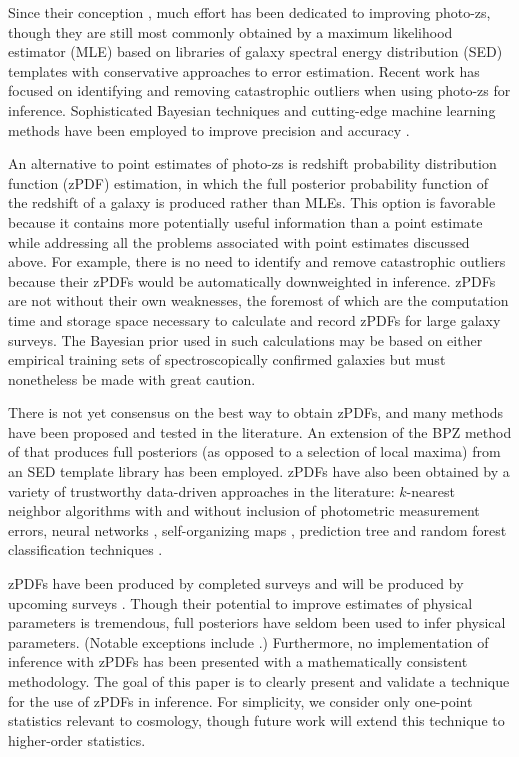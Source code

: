 \documentclass[preprint]{aastex}
\begin{document}
Since their conception \citep{bau62}, much effort has been dedicated to 
improving photo-zs, though they are still most commonly obtained by a maximum 
likelihood estimator (MLE) based on libraries of galaxy spectral energy 
distribution (SED) templates with conservative approaches to error estimation.  
Recent work has focused on identifying and removing catastrophic outliers when 
using photo-zs for inference.  \citep{gor13}  Sophisticated Bayesian techniques 
and cutting-edge machine learning methods have been employed to improve 
precision \citep{car10} and accuracy \citep{sad15}. 

An alternative to point estimates of photo-zs is redshift probability 
distribution function (zPDF) estimation, in which the full posterior 
probability function of the redshift of a galaxy is produced rather than MLEs.  
\citep{bud08}  This option is favorable because it contains more potentially 
useful information than a point estimate while addressing all the problems 
associated with point estimates discussed above.  For example, there is no need 
to identify and remove catastrophic outliers because their zPDFs would be 
automatically downweighted in inference.  zPDFs are not without their own 
weaknesses, the foremost of which are the computation time and storage space 
necessary to calculate and record zPDFs for large galaxy surveys.  
\citep{car14b}  The Bayesian prior used in such calculations may be based on 
either empirical training sets of spectroscopically confirmed galaxies but must 
nonetheless be made with great caution.

There is not yet consensus on the best way to obtain zPDFs, and many methods 
have been proposed and tested in the literature.  An extension of the BPZ 
method of \citet{ben98} that produces full posteriors (as opposed to a 
selection of local maxima) from an SED template library has been employed.  
\citep{hil11, kel12, lop14}  zPDFs have also been obtained by a variety of 
trustworthy data-driven approaches in the literature: $k$-nearest neighbor 
algorithms with \citep{bal08} and without \citep{she11} inclusion of 
photometric measurement errors, neural networks \citep{bon13}, self-organizing 
maps \citep{car14a}, prediction tree and random forest classification 
techniques \citep{car10, car13}.  

zPDFs have been produced by completed surveys \citep{hil11, she11} and will be 
produced by upcoming surveys \citep{abe09, car14a}.  Though their potential to 
improve estimates of physical parameters is tremendous, full posteriors have 
seldom been used to infer physical parameters.  (Notable exceptions include 
\citet{app12}.)  Furthermore, no implementation of inference with zPDFs has 
been presented with a mathematically consistent methodology.  The goal of this 
paper is to clearly present and validate a technique for the use of zPDFs in 
inference.  For simplicity, we consider only one-point statistics relevant to 
cosmology, though future work will extend this technique to higher-order 
statistics.
\end{document}
